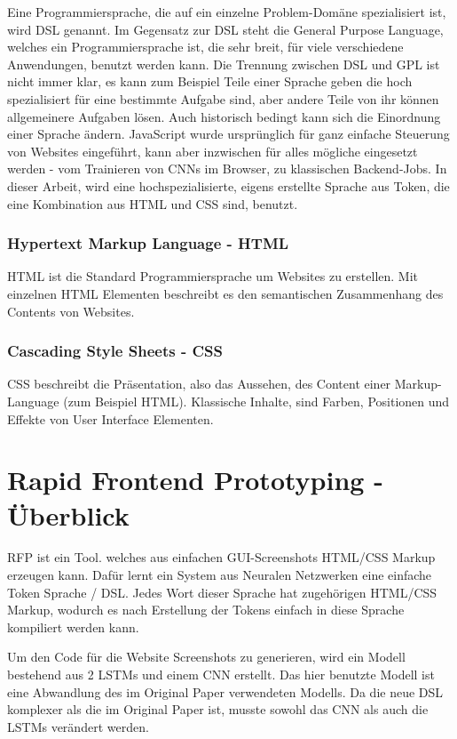\documentclass[pdftex,a4paper,halfparskip, article]{scrartcl}
\begin{document}
Eine Programmiersprache, die auf ein einzelne Problem-Domäne spezialisiert ist, wird DSL genannt. Im Gegensatz zur DSL steht die General Purpose Language, welches ein Programmiersprache ist, die sehr breit, für viele verschiedene Anwendungen, benutzt werden kann. Die Trennung zwischen DSL und GPL ist nicht immer klar, es kann zum Beispiel Teile einer Sprache geben die hoch spezialisiert für eine bestimmte Aufgabe sind, aber andere Teile von ihr können allgemeinere Aufgaben lösen. Auch historisch bedingt kann sich die Einordnung einer Sprache ändern. JavaScript wurde ursprünglich für ganz einfache Steuerung von Websites eingeführt, kann aber inzwischen für alles mögliche eingesetzt werden - vom Trainieren von CNNs im Browser, zu klassischen Backend-Jobs. 
In dieser Arbeit, wird eine hochspezialisierte, eigens erstellte Sprache aus Token, die eine Kombination aus HTML und CSS sind, benutzt.

\subsubsection{Hypertext Markup Language - HTML}
HTML ist die Standard Programmiersprache um Websites zu erstellen. Mit einzelnen HTML Elementen beschreibt es den semantischen Zusammenhang des Contents von Websites.

\subsubsection{Cascading Style Sheets - CSS}
CSS beschreibt die Präsentation, also das Aussehen, des Content einer Markup-Language (zum Beispiel HTML). Klassische Inhalte, sind Farben, Positionen und Effekte von User Interface Elementen.
 

\section{Rapid Frontend Prototyping - Überblick}

RFP ist ein Tool. welches aus einfachen GUI-Screenshots HTML/CSS Markup erzeugen kann. Dafür lernt ein System aus Neuralen Netzwerken eine einfache Token Sprache / DSL. Jedes Wort dieser Sprache hat zugehörigen HTML/CSS Markup, wodurch es nach Erstellung der Tokens einfach in diese Sprache kompiliert werden kann.

Um den Code für die Website Screenshots zu generieren, wird ein Modell bestehend aus 2 LSTMs und einem CNN erstellt. Das hier benutzte Modell ist eine Abwandlung des im Original Paper verwendeten Modells. Da die neue DSL komplexer als die im Original Paper\cite{Beltramelli17} ist, musste sowohl das CNN als auch die LSTMs verändert werden. 
\end{document}
